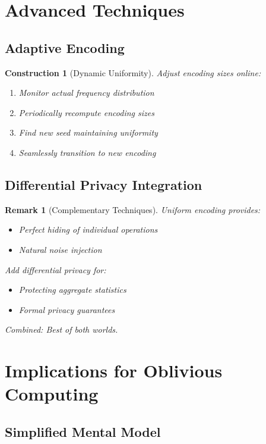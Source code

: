 \documentclass[11pt,final,hidelinks]{article}
\newtheorem{remark}[theorem]{Remark}
\newtheorem{construction}[theorem]{Construction}
\begin{document}
\section{Advanced Techniques}

\subsection{Adaptive Encoding}

\begin{construction}[Dynamic Uniformity]
Adjust encoding sizes online:
\begin{enumerate}
    \item Monitor actual frequency distribution
    \item Periodically recompute encoding sizes
    \item Find new seed maintaining uniformity
    \item Seamlessly transition to new encoding
\end{enumerate}
\end{construction}

\subsection{Differential Privacy Integration}

\begin{remark}[Complementary Techniques]
Uniform encoding provides:
\begin{itemize}
    \item Perfect hiding of individual operations
    \item Natural noise injection
\end{itemize}
Add differential privacy for:
\begin{itemize}
    \item Protecting aggregate statistics
    \item Formal privacy guarantees
\end{itemize}
Combined: Best of both worlds.
\end{remark}

\section{Implications for Oblivious Computing}

\subsection{Simplified Mental Model}
\end{document}

